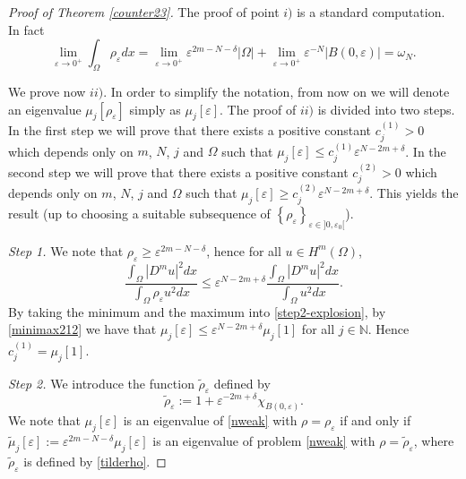 \documentclass[11pt,a4paper]{amsart}
\numberwithin{equation}{section}
\begin{document}
\begin{proof}[Proof of Theorem \ref{counter23}]
The proof of point $i)$ is a standard computation. In fact
\begin{equation*}
\lim_{\varepsilon\rightarrow 0^+}\int_{\Omega}\rho_{\varepsilon}dx=\lim_{\varepsilon\rightarrow 0^+}\varepsilon^{2m-N-\delta}|\Omega|+\lim_{\varepsilon\rightarrow 0^+}\varepsilon^{-N}|B(0,\varepsilon)|=\omega_N.
\end{equation*}

We prove now $ii)$. In order to simplify the notation, from now on we will denote an eigenvalue $\mu_j[\rho_{\varepsilon}]$ simply as $\mu_j[\varepsilon]$. The proof of $ii)$ is divided into two steps. In the first step we will prove that there exists a positive constant $c_j^{(1)}>0$ which depends only on $m$, $N$, $j$ and $\Omega$ such that $\mu_j[\varepsilon]\leq c_j^{(1)}\varepsilon^{N-2m+\delta}$. In the second step we will prove that there exists a positive constant $c_j^{(2)}>0$ which depends only on $m$, $N$, $j$ and $\Omega$ such that $\mu_j[\varepsilon]\geq c_j^{(2)}\varepsilon^{N-2m+\delta}$. This yields the result (up to choosing a suitable subsequence of $\left\{\rho_{\varepsilon}\right\}_{\varepsilon\in]0,\varepsilon_0[}$).


{\it Step 1.} We note that $\rho_{\varepsilon}\geq\varepsilon^{2m-N-\delta}$, hence for all $u\in H^m(\Omega)$,
\begin{equation}\label{step2-explosion}
\frac{\int_{\Omega}|D^mu|^2dx}{\int_{\Omega}\rho_{\varepsilon}u^2dx}\leq\varepsilon^{N-2m+\delta}\frac{\int_{\Omega}|D^mu|^2dx}{\int_{\Omega}u^2dx}.
\end{equation}
By taking the minimum and the maximum into \eqref{step2-explosion}, by \eqref{minimax212} we have that $\mu_j[\varepsilon]\leq\varepsilon^{N-2m+\delta}\mu_j[1]$ for all $j\in\mathbb N$. Hence $c_j^{(1)}=\mu_j[1]$.


{\it Step 2.} We introduce the function $\tilde\rho_{\varepsilon}$ defined by
\begin{equation}\label{tilderho}
\tilde\rho_{\varepsilon}:=1+\varepsilon^{-2m+\delta}\chi_{B(0,\varepsilon)}.
\end{equation}
We note that $\mu_j[\varepsilon]$ is an eigenvalue of \eqref{nweak} with $\rho=\rho_{\varepsilon}$ if and only if  $\tilde\mu_j[\varepsilon]:=\varepsilon^{2m-N-\delta}\mu_j[\varepsilon]$ is an eigenvalue of problem \eqref{nweak} with $\rho=\tilde\rho_{\varepsilon}$, where $\tilde\rho_{\varepsilon}$ is defined by \eqref{tilderho}.


\end{proof}
\end{document}
